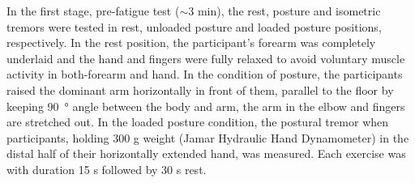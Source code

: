 \documentclass[conference, a4paper]{IEEEtran}
\begin{document}
In the first stage, pre-fatigue test ($\sim 3$ min), the rest, posture and isometric tremors were tested in rest, unloaded posture and loaded posture positions, respectively. In the rest position, the participant's forearm was completely underlaid and the hand and fingers were fully relaxed to avoid voluntary muscle activity in both-forearm and hand. In the condition of posture, the participants raised the dominant arm horizontally in front of them, parallel to the floor by keeping \SI{90}{\degree} angle between the body and arm, the arm in the elbow and fingers are stretched out. In the loaded posture condition, the postural tremor when participants, holding 300 g weight (Jamar Hydraulic Hand Dynamometer) in the distal half of their horizontally extended hand, was measured. Each exercise was with duration 15 s followed by 30 s rest.
\end{document}
